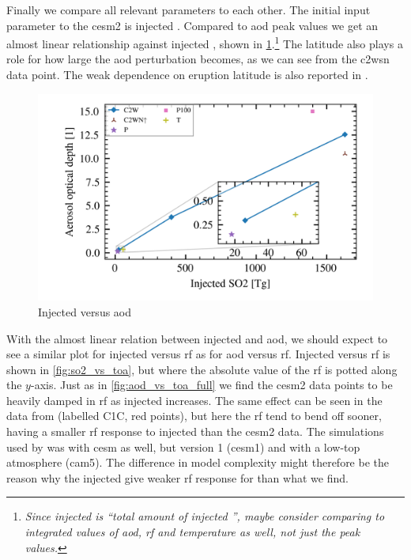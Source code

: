 \documentclass{ametsocV5}
\newcommand{\iso}[1][i]{{#1}njected \ce{SO2}}
\begin{document}
Finally we compare all relevant parameters to each other. The initial input parameter to
the \ac{cesm2} is injected . Compared to \ac{aod} peak values we get an almost
linear relationship against \iso{}, shown in \cref{fig:so2_vs_aod}.\footnote{\emph{Since
    \iso{} is ``total amount of \iso{}'', maybe consider comparing to integrated values of
    \ac{aod}, \ac{rf} and temperature as well, not just the peak values.}} The latitude also
plays a role for how large the \ac{aod} perturbation becomes, as we can see from the
\ac{c2wsn} data point. The weak dependence on eruption latitude is also reported in
\citet{marshall2019}.

\begin{figure}[t]
  \begin{center}
    \includegraphics[width=0.95\linewidth]{figures/injection_vs_aod.png}
  \end{center}
  \caption{Injected  versus \ac{aod}}%
  \label{fig:so2_vs_aod}
\end{figure}

With the almost linear relation between injected  and \ac{aod}, we should expect
to see a similar plot for \iso{} versus \ac{rf} as for \ac{aod} versus \ac{rf}. \iso[I]
versus \ac{rf} is shown in \cref{fig:so2_vs_toa}, but where the absolute value of the
\ac{rf} is potted along the \( y \)-axis. Just as in \cref{fig:aod_vs_toa_full} we find
the \ac{cesm2} data points to be heavily damped in \ac{rf} as \iso{} increases. The same
effect can be seen in the data from \citet{ottobliesner2016} (labelled C1C, red points),
but here the \ac{rf} tend to bend off sooner, having a smaller \ac{rf} response to
\iso{} than the \ac{cesm2} data. The simulations used by \citet{ottobliesner2016} was
with \ac{cesm} as well, but version 1 (\ac{cesm1}) and with a low-top atmosphere
(\ac{cam5}). The difference in model complexity might therefore be the reason why the
\iso{} give weaker \ac{rf} response for \citet{ottobliesner2016} than what we find.
\end{document}
